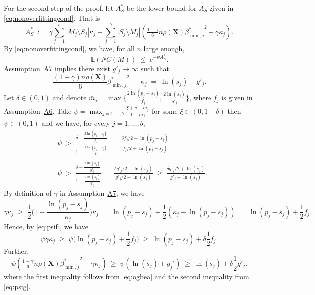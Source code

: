 \documentclass[bj,authoryear]{imsart}
\theoremstyle{plain}
\newcommand{\E}{\mathbb{E}}
\newcommand{\bs}{\boldsymbol}
\begin{document}
For the second step of the proof, let $A_S^*$ be the lower bound for $A_S$ given in \eqref{eq:nonoverfittingcond}. That is 
$$A_S^*\;:=\;\gamma\sum_{j=1}^b|M_j \setminus S_j|\kappa_j + \sum_{j=1}^b |S_j\setminus M_j |\left(\tfrac{1-\gamma}{6} n \rho(\bs X) {\beta^*_{\min,j}}^{2} - \gamma\kappa_j\right).$$
By \eqref{eq:nonoverfittingcond}, we have, for all $n$ large enough,
\begin{equation}\label{eq:boundexp}
    \E(NC(M))\;\leq\;e^{-\psi A_S^*}.
\end{equation}
Assumption~\hyperlink{lab:A7}{A7} implies there exist $g'_j \to \infty$ such that
\begin{equation}\label{eq:ogbea}
    \frac{(1-\gamma) n\rho(\bs X)}{6}{\beta_{\min,j}^*}^2 \,- \,\kappa_j \;=\; \ln(s_j) + g'_{j}.
\end{equation}
Let $\delta \in (0,1)$ and denote $\bar{m}_j=\max\big\{\frac{2\ln(p_j-s_j)}{f_j},\frac{2\ln(s_j)}{g'_{j}}\big\}$, where $f_j$ is given in Assumption~\hyperlink{lab:A6}{A6}. 
Take $\psi=\max_{j=1,\ldots,b}\frac{\xi + \delta + \bar{m}_j}{1+\bar{m}_j}$ for some $\xi \in(0, 1- \delta)$ then $\psi \in (0,1)$ and we have, for every $j=1,\ldots,b$,
\begin{align}
    &\psi \;>\; \frac{\delta + \frac{2\ln(p_j-s_j)}{f_j}}{1+\frac{2\ln(p_j-s_j)}{f_j}} \;=\; \frac{\delta f_j/2 + \ln(p_j-s_j)}{f_j/2 +\ln(p_j-s_j)} \label{eq:psif}\\
    &\psi \;>\; \frac{\delta + \frac{2\ln(s_j)}{g'_j}}{1+\frac{2\ln(s_j)}{g'_j}} \;=\;  \frac{\delta g'_j/2 + \ln(s_j)}{g'_j/2 +\ln(s_j)} \;\geq\; \frac{\delta g'_j/2 + \ln(s_j)}{g'_j +\ln(s_j)}.\label{eq:psig}
\end{align}
By definition of $\gamma$ in Assumption~\hyperlink{lab:A7}{A7}, we have 
$$
\gamma\kappa_j\;\geq\;\frac12 \Big(1+\frac{\ln(p_j-s_j)}{\kappa_j}\Big)\kappa_j\;=\;\ln(p_j-s_j)+\frac12(\kappa_j-\ln(p_j-s_j)) \;=\; \ln(p_j-s_j)+ \frac12f_j.
$$
Hence, by \eqref{eq:psif}, we have
\begin{equation}\label{eq:ooofjfj}
\psi\gamma\kappa_j \;\geq\; \psi\big(\ln(p_j-s_j)+ \frac12f_j\big) \;\geq\;  \ln(p_j-s_j)+ \delta\frac12f_j.
\end{equation}
Further,
\begin{equation}\label{eq:ooofjfj2}
\psi\left(\tfrac{1-\gamma}{6} n \rho(\bs X) {\beta^*_{\min,j}}^{2} - \gamma\kappa_j\right) \;\geq\; \psi\left(\ln(s_j)+g_j'\right) \;\geq\; \ln(s_j)+\delta \frac{1}{2}g'_j.
\end{equation}
where the first inequality follows from \eqref{eq:ogbea} and the second inequality from \eqref{eq:psig}.
\end{document}
